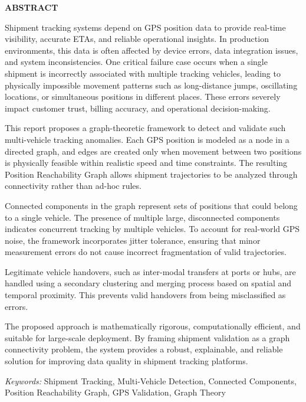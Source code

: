 \newpage
{}
\begin{center}
{\large \bf ABSTRACT}
\end{center}

Shipment tracking systems depend on GPS position data to provide real-time visibility, accurate ETAs, and reliable operational insights. In production environments, this data is often affected by device errors, data integration issues, and system inconsistencies. One critical failure case occurs when a single shipment is incorrectly associated with multiple tracking vehicles, leading to physically impossible movement patterns such as long-distance jumps, oscillating locations, or simultaneous positions in different places. These errors severely impact customer trust, billing accuracy, and operational decision-making.

This report proposes a graph-theoretic framework to detect and validate such multi-vehicle tracking anomalies. Each GPS position is modeled as a node in a directed graph, and edges are created only when movement between two positions is physically feasible within realistic speed and time constraints. The resulting Position Reachability Graph allows shipment trajectories to be analyzed through connectivity rather than ad-hoc rules.

Connected components in the graph represent sets of positions that could belong to a single vehicle. The presence of multiple large, disconnected components indicates concurrent tracking by multiple vehicles. To account for real-world GPS noise, the framework incorporates jitter tolerance, ensuring that minor measurement errors do not cause incorrect fragmentation of valid trajectories.

Legitimate vehicle handovers, such as inter-modal transfers at ports or hubs, are handled using a secondary clustering and merging process based on spatial and temporal proximity. This prevents valid handovers from being misclassified as errors.

The proposed approach is mathematically rigorous, computationally efficient, and suitable for large-scale deployment. By framing shipment validation as a graph connectivity problem, the system provides a robust, explainable, and reliable solution for improving data quality in shipment tracking platforms.

\vspace{0.3in}
\textit{Keywords:} Shipment Tracking, Multi-Vehicle Detection, Connected Components, Position Reachability Graph, GPS Validation, Graph Theory
